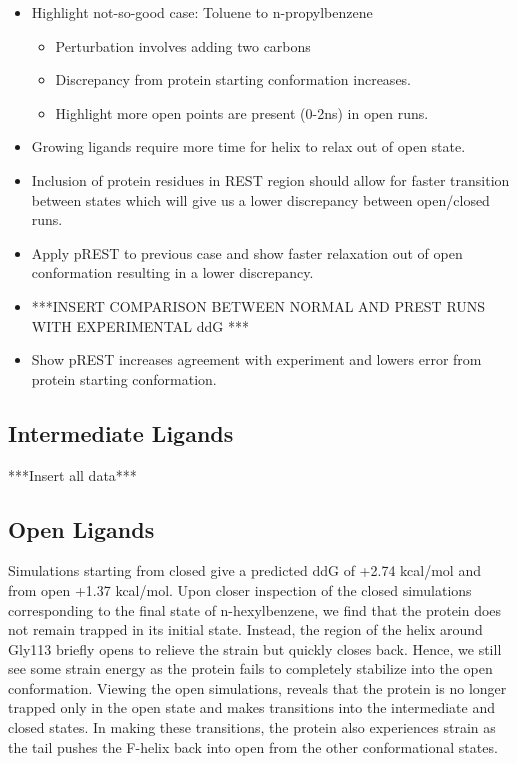 \documentclass[journal=jctcce,manuscript=article]{achemso}
\begin{document}
\begin{suppinfo}
\begin{itemize}
   \item Highlight not-so-good case: Toluene to n-propylbenzene
      \begin{itemize}
      \item Perturbation involves adding two carbons
      \item Discrepancy from protein starting conformation increases.
      \item Highlight more open points are present (0-2ns) in open runs.
      \end{itemize}
   \item Growing ligands require more time for helix to relax out of open state.
   \item Inclusion of protein residues in REST region should allow for faster transition between states which will give us a lower discrepancy between open/closed runs.
   \item Apply pREST to previous case and show faster relaxation out of open conformation resulting in a lower discrepancy.
   \item ***INSERT COMPARISON BETWEEN NORMAL AND PREST RUNS WITH EXPERIMENTAL ddG ***
   \item Show pREST increases agreement with experiment and lowers error from protein starting conformation.
   \end{itemize}

\subsection{Intermediate Ligands}
***Insert all data***
\subsection{Open Ligands}
Simulations starting from closed give a predicted ddG of +2.74 kcal/mol and from open +1.37 kcal/mol.
Upon closer inspection of the closed simulations corresponding to the final state of n-hexylbenzene, we find that the protein does not remain trapped in its initial state.
Instead, the region of the helix around Gly113 briefly opens to relieve the strain but quickly closes back.
Hence, we still see some strain energy as the protein fails to completely stabilize into the open conformation.
Viewing the open simulations, reveals that the protein is no longer trapped only in the open state and makes transitions into the intermediate and closed states.
In making these transitions, the protein also experiences strain as the tail pushes the F-helix back into open from the other conformational states.\\


\end{suppinfo}
\end{document}
